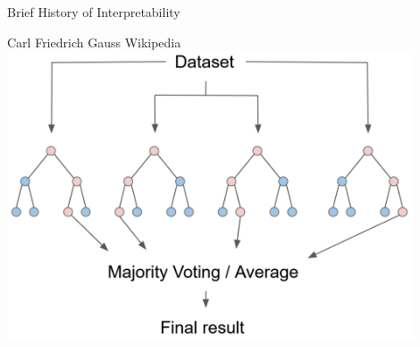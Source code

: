 \documentclass[10pt,compress,t,notes=noshow, xcolor=table]{beamer}
\begin{document}
\begin{frame}{Brief History of Interpretability}
\begin{splitVCC}[0.75]
{    %
    \centering Carl Friedrich Gauss 
    \centering Wikipedia 
    \bigskip\\
    \includegraphics[width=0.9\textwidth]{figure/Random_Forest.png}

}
\end{splitVCC}
\end{frame}

\endlecture
\end{document}
